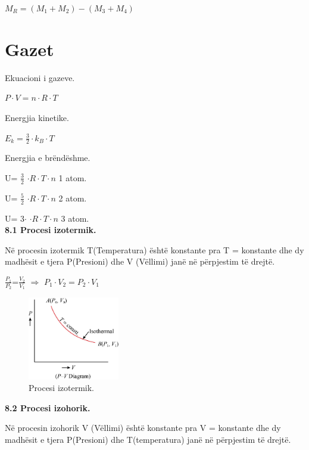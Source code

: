 \documentclass[twocolumn]{article}
\begin{document}
	
	
	
	$M_R=(M_1+M_2)-(M_3+M_4)$
	
	
	\section{Gazet}
	
	\begin{center}
		Ekuacioni i gazeve.
	\end{center}
	
	$P \cdot V =n \cdot R \cdot T$
	
	\begin{center}
		Energjia kinetike.
	\end{center}
	
	$E_k=\frac{3}{2} \cdot k_B \cdot T$
	
	\begin{center}
		Energjia e brëndëshme.
	\end{center}
	
	U= $\frac{3}{2}$ $\cdot R \cdot T \cdot n $ 1 atom.
	
	U= $\frac{5}{2}$ $\cdot R \cdot T \cdot n $ 2 atom.
	
	U= 3$\cdot$ $\cdot R \cdot T \cdot n $ 3 atom.\\
	
	
	\textbf{8.1 Procesi izotermik.}
	
	Në procesin izotermik T(Temperatura) është konstante pra T = konstante dhe dy
	madhësit e tjera P(Presioni) dhe V (Vëllimi) janë në përpjestim të drejtë.
	
	$\frac{P_1}{P_2}$=$\frac{V_2}{V_1}$ $\Rightarrow$ $P_1 \cdot V_2=P_2 \cdot V_1$
	
	\begin{figure}[h]
		\includegraphics[width=40mm]{Imazhet/procesi_izotermik.jpg}
		\caption{Procesi izotermik.}
		\label{fig:boat1}
	\end{figure}
	
	\textbf{8.2 Procesi izohorik.}
	
	Në procesin izohorik V (Vëllimi) është konstante pra V = konstante dhe dy madhësit e
	tjera P(Presioni) dhe T(temperatura) janë në përpjestim të drejtë.
	
\end{document}
